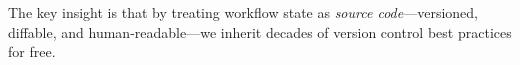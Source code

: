 The key insight is that by treating workflow state as \emph{source code}---versioned, diffable, and human-readable---we inherit decades of version control best practices for free.

